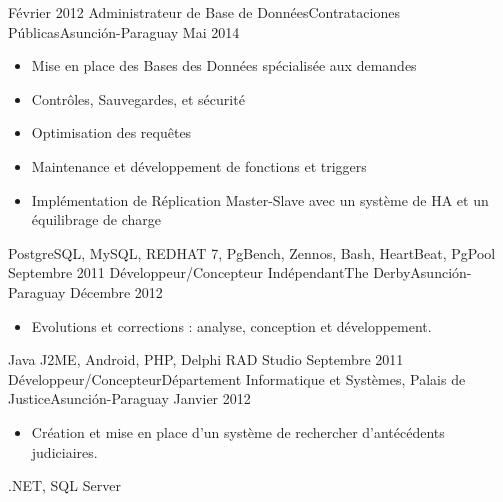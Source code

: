 \begin{experiences}
  \experience
    {Février 2012}   {Administrateur de Base de Données}{Contrataciones Públicas}{Asunción-Paraguay}
    {Mai 2014} {
                      \begin{itemize}
                        \item Mise en place des Bases des Données spécialisée aux demandes
                        \item Contrôles, Sauvegardes, et sécurité
                        \item Optimisation des requêtes
                        \item Maintenance et développement de fonctions et triggers
                        \item Implémentation de Réplication Master-Slave avec un système de HA et un équilibrage de charge 
                      \end{itemize}
				}
                {PostgreSQL, MySQL, REDHAT 7, PgBench, Zennos, Bash, HeartBeat, PgPool}                    
  \emptySeparator
  \experience
    {Septembre 2011}   {Développeur/Concepteur Indépendant}{The Derby}{Asunción-Paraguay}
    {Décembre 2012} {
                      \begin{itemize}
                        \item Evolutions et corrections : analyse, conception et développement.
                      \end{itemize}
				}
                {Java J2ME, Android, PHP, Delphi RAD Studio}
  \emptySeparator
  \experience
    {Septembre 2011}   {Développeur/Concepteur}{Département Informatique et Systèmes, Palais de Justice}{Asunción-Paraguay}
    {Janvier 2012} {
                      \begin{itemize}
                        \item Création et mise en place d’un système de rechercher d’antécédents judiciaires.
                      \end{itemize}
				}
                {.NET, SQL Server}
  \emptySeparator                
\end{experiences}

